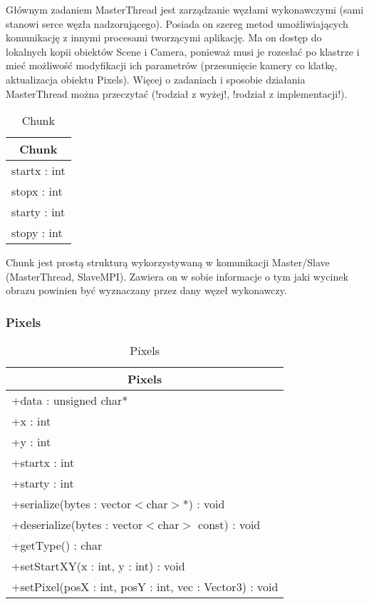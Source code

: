 Głównym zadaniem MasterThread jest zarządzanie węzłami wykonawczymi (sami stanowi serce węzła nadzorującego). Posiada on szereg metod umożliwiających komunikację z innymi procesami tworzącymi aplikację. Ma on dostęp do lokalnych kopii obiektów Scene i Camera, ponieważ musi je rozesłać po klastrze i mieć możliwość modyfikacji ich parametrów (przesunięcie kamery co klatkę, aktualizacja obiektu Pixels). Więcej o zadaniach i sposobie działania MasterThread można przeczytać (!rodział z wyżej!, !rodział z implementacji!).

\footnotesize
\begin{longtable}{|p{14cm}|}
    \caption{Chunk} \label{tab:Chunk} \\ \hline
    \multicolumn{1}{|c|}{Chunk} \\ \hline
    startx : int \\
    stopx : int \\
    starty : int \\
    stopy : int \\
    \hline
\end{longtable}
\normalsize

Chunk jest prostą strukturą wykorzystywaną w komunikacji Master/Slave (MasterThread, SlaveMPI). Zawiera on w sobie informacje o tym jaki wycinek obrazu powinien być wyznaczany przez dany węzeł wykonawczy.


\subsubsection{Pixels}

\footnotesize
\begin{longtable}{|p{14cm}|}
    \caption{Pixels} \label{tab:Pixels} \\ \hline
    \multicolumn{1}{|c|}{Pixels} \\ \hline
    +data : unsigned char* \\
    +x : int \\
    +y : int \\ 
    +startx : int \\
    +starty : int \\
    \hline
	+serialize(bytes : vector$<$char$>$*) : void \\
	+deserialize(bytes : vector$<$char$>$ const) : void \\
	+getType() : char \\
	+setStartXY(x : int, y : int) : void \\
	+setPixel(posX : int, posY : int, vec : Vector3) : void \\
	\hline
\end{longtable}
\normalsize

